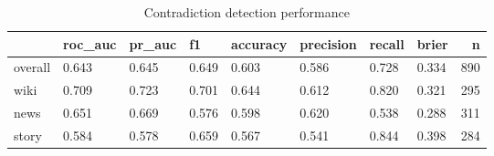 \begin{table}
\caption{Contradiction detection performance}
\label{tab:results}
\begin{tabular}{llllllllr}
\toprule
 & roc_auc & pr_auc & f1 & accuracy & precision & recall & brier & n \\
\midrule
overall & 0.643 & 0.645 & 0.649 & 0.603 & 0.586 & 0.728 & 0.334 & 890 \\
wiki & 0.709 & 0.723 & 0.701 & 0.644 & 0.612 & 0.820 & 0.321 & 295 \\
news & 0.651 & 0.669 & 0.576 & 0.598 & 0.620 & 0.538 & 0.288 & 311 \\
story & 0.584 & 0.578 & 0.659 & 0.567 & 0.541 & 0.844 & 0.398 & 284 \\
\bottomrule
\end{tabular}
\end{table}
